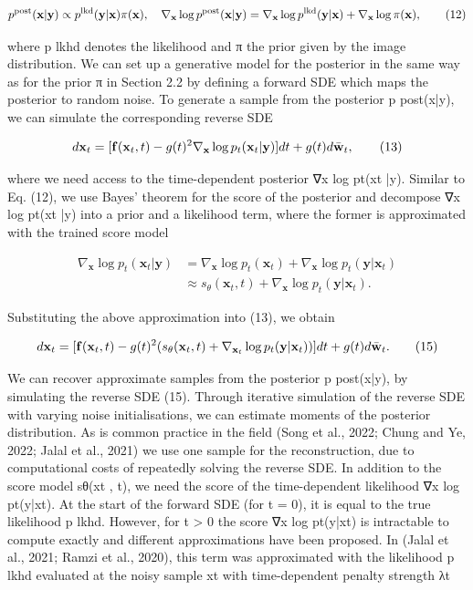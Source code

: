 \documentclass{article}
\begin{document}
$$p^{\rm post}({\bf x}|{\bf y})\propto p^{\rm lkd}({\bf y}|{\bf x})\pi({\bf x}),\quad\nabla_{\bf x}\log p^{\rm post}({\bf x}|{\bf y})=\nabla_{\bf x}\log p^{\rm lkd}({\bf y}|{\bf x})+\nabla_{\bf x}\log\pi({\bf x}),\tag{12}$$

where p lkhd denotes the likelihood and π the prior given by the image distribution. We can set up a generative model for the posterior in the same way as for the prior π in Section 2.2 by defining a forward SDE which maps the posterior to random noise. To generate a sample from the posterior p post(x|y), we can simulate the corresponding reverse SDE

$$d{\bf x}_{t}=[{\bf f}({\bf x}_{t},t)-g(t)^{2}\nabla_{\bf x}\log p_{t}({\bf x}_{t}|{\bf y})]dt+g(t)d\bar{\bf w}_{t},\tag{13}$$

where we need access to the time-dependent posterior ∇x log pt(xt |y). Similar to Eq. (12), we use Bayes' theorem for the score of the posterior and decompose ∇x log pt(xt |y) into a prior and a likelihood term, where the former is approximated with the trained score model

$$\begin{split}\nabla_{\mathbf{x}}\log p_{t}(\mathbf{x}_{t}|\mathbf{y})&=\nabla_{\mathbf{x}}\log p_{t}(\mathbf{x}_{t})+\nabla_{\mathbf{x}}\log p_{t}(\mathbf{y}|\mathbf{x}_{t})\\ &\approx s_{\theta}(\mathbf{x}_{t},t)+\nabla_{\mathbf{x}}\log p_{t}(\mathbf{y}|\mathbf{x}_{t}).\end{split}\tag{14}$$

Substituting the above approximation into (13), we obtain

$$d{\bf x}_{t}=[{\bf f}({\bf x}_{t},t)-g(t)^{2}(s_{\theta}({\bf x}_{t},t)+\nabla_{{\bf x}_{t}}\log p_{t}({\bf y}|{\bf x}_{t}))]dt+g(t)d\bar{\bf w}_{t}.\tag{15}$$

We can recover approximate samples from the posterior p post(x|y), by simulating the reverse SDE (15). Through iterative simulation of the reverse SDE with varying noise initialisations, we can estimate moments of the posterior distribution. As is common practice in the field (Song et al., 2022; Chung and Ye, 2022; Jalal et al., 2021) we use one sample for the reconstruction, due to computational costs of repeatedly solving the reverse SDE. In addition to the score model sθ(xt , t), we need the score of the time-dependent likelihood ∇x log pt(y|xt). At the start of the forward SDE (for t = 0), it is equal to the true likelihood p lkhd. However, for t > 0 the score ∇x log pt(y|xt) is intractable to compute exactly and different approximations have been proposed. In (Jalal et al., 2021; Ramzi et al., 2020), this term was approximated with the likelihood p lkhd evaluated at the noisy sample xt with time-dependent penalty strength λt
\end{document}
